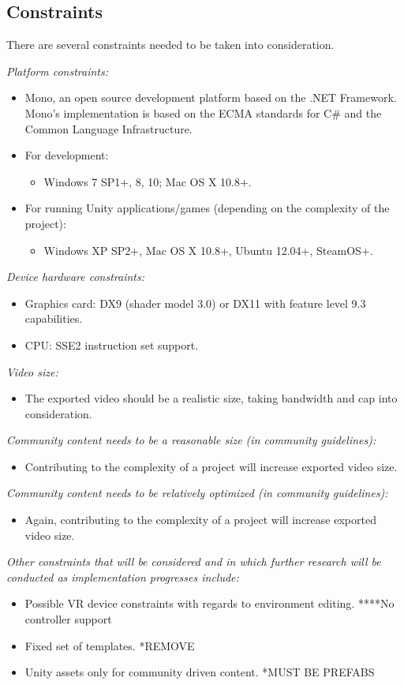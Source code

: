 \documentclass{article}
\begin{document}
\subsection{Constraints}
There are several constraints needed to be taken into consideration.
\bigskip
\begin{flushleft}
\textsl{Platform constraints:}
\end{flushleft}
	\begin{itemize}
		\item Mono, an open source development platform based on the .NET Framework. Mono’s implementation is based on the ECMA standards for C\# and the Common Language Infrastructure.
		\item For development:
			\begin{itemize}
				\item Windows 7 SP1+, 8, 10; Mac OS X 10.8+.
			\end{itemize}
		\item For running Unity applications/games (depending on the complexity of the project):
			\begin{itemize}
				\item Windows XP SP2+, Mac OS X 10.8+, Ubuntu 12.04+, SteamOS+.
			\end{itemize}
	\end{itemize}
\medskip
\textsl{Device hardware constraints:}
	\begin{itemize}
		\item Graphics card: DX9 (shader model 3.0) or DX11 with feature level 9.3 capabilities.
		\item CPU: SSE2 instruction set support.
	\end{itemize}
\medskip
\textsl{Video size:}
	\begin{itemize}
		\item The exported video should be a realistic size, taking bandwidth and cap into consideration.
	\end{itemize}
\medskip
\textsl{Community content needs to be a reasonable size (in community guidelines):}
	\begin{itemize}
		\item Contributing to the complexity of a project will increase exported video size.
	\end{itemize}
\medskip
\textsl{Community content needs to be relatively optimized (in community guidelines):}
	\begin{itemize}
		\item Again, contributing to the complexity of a project will increase exported video size.
	\end{itemize}
\medskip
\textsl{Other constraints that will be considered and in which further research will be conducted as implementation progresses include:}
	\begin{itemize}
		\item Possible VR device constraints with regards to environment editing. ****No controller support
		\item Fixed set of templates. *REMOVE
		\item Unity assets only for community driven content. *MUST BE PREFABS
	\end{itemize}
\end{document}

